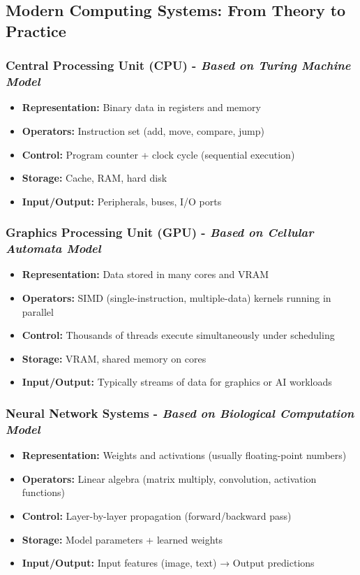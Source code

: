 \subsection{Modern Computing Systems: From Theory to Practice}

\subsubsection{Central Processing Unit (CPU) - \textit{Based on Turing Machine Model}}

\begin{itemize}
\item \textbf{Representation:} Binary data in registers and memory
\item \textbf{Operators:} Instruction set (add, move, compare, jump)
\item \textbf{Control:} Program counter + clock cycle (sequential execution)
\item \textbf{Storage:} Cache, RAM, hard disk
\item \textbf{Input/Output:} Peripherals, buses, I/O ports
\end{itemize}

\subsubsection{Graphics Processing Unit (GPU) - \textit{Based on Cellular Automata Model}}

\begin{itemize}
\item \textbf{Representation:} Data stored in many cores and VRAM
\item \textbf{Operators:} SIMD (single-instruction, multiple-data) kernels running in parallel
\item \textbf{Control:} Thousands of threads execute simultaneously under scheduling
\item \textbf{Storage:} VRAM, shared memory on cores
\item \textbf{Input/Output:} Typically streams of data for graphics or AI workloads
\end{itemize}

\subsubsection{Neural Network Systems - \textit{Based on Biological Computation Model}}

\begin{itemize}
\item \textbf{Representation:} Weights and activations (usually floating-point numbers)
\item \textbf{Operators:} Linear algebra (matrix multiply, convolution, activation functions)
\item \textbf{Control:} Layer-by-layer propagation (forward/backward pass)
\item \textbf{Storage:} Model parameters + learned weights
\item \textbf{Input/Output:} Input features (image, text) → Output predictions
\end{itemize}


